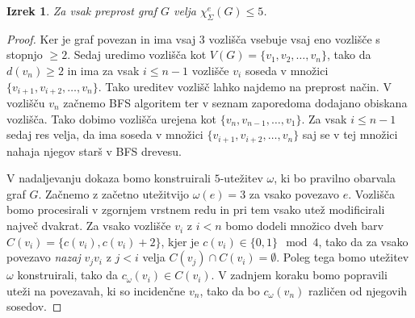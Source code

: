 \documentclass[12pt,a4paper,twoside]{article}
\theoremstyle{definition} %
\theoremstyle{plain} %
\newtheorem{izrek}[definicija]{Izrek}
\newcommand{\ec}{\chi_{\Sigma}^e}
\numberwithin{equation}{section}  %
\begin{document}
 
 \begin{izrek}
\label{theorem12345}
 	Za vsak preprost graf $G$ velja $\ec(G) \le 5$.
 \end{izrek}

\begin{proof}
	Ker je graf povezan in ima vsaj 3 vozlišča vsebuje vsaj eno vozlišče s stopnjo $\ge 2$. Sedaj uredimo vozlišča kot $V(G) = \{ v_1, v_2, \ldots, v_n\}$, tako da $d(v_n) \ge 2$ in ima za vsak $i \le n-1$ vozlišče $v_i$ soseda v množici $\{v_{i+1}, v_{i+2}, \ldots, v_n\}$. Tako ureditev vozlišč lahko najdemo na preprost način. V vozlišču $v_n$ začnemo BFS algoritem ter v seznam zaporedoma dodajano obiskana vozlišča. Tako dobimo vozlišča urejena kot $\{v_n, v_{n-1}, \ldots, v_1\}$. Za vsak $i \le n-1$ sedaj res velja, da ima soseda v množici   $\{v_{i+1}, v_{i+2}, \ldots, v_n\}$ saj se v tej množici nahaja njegov starš v BFS drevesu.

V nadaljevanju dokaza bomo konstruirali $5$-utežitev $\omega$, ki bo pravilno obarvala graf $G$. Začnemo z začetno utežitvijo $\omega(e) = 3$ za vsako povezavo $e$. Vozlišča bomo procesirali v zgornjem vrstnem redu in pri tem vsako utež modificirali največ dvakrat. Za vsako vozlišče $v_i$ z $i < n$ bomo dodeli množico dveh barv $C(v_i) = \{c(v_i), c(v_i) + 2\}$, kjer je $c(v_i) \in \{0,1\}  \mod 4$, tako da za vsako povezavo \textit{nazaj} $v_jv_i$ z $j < i$ velja $C(v_j) \cap C(v_i) =\emptyset$. Poleg tega bomo utežitev $\omega$ konstruirali, tako da $c_{\omega}(v_i) \in C(v_i)$. V zadnjem koraku bomo popravili uteži na povezavah, ki so incidenčne $v_n$, tako da bo $c_{\omega}(v_n)$ različen od njegovih sosedov.


\end{proof}
\end{document}
